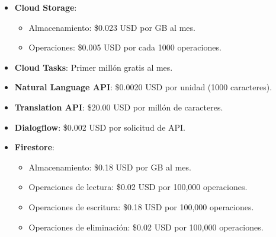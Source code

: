 \begin{enumerate}
\begin{enumerate}
\begin{itemize}
					\item \textbf{Cloud Storage}:
						\begin{itemize}
							\item Almacenamiento: \$0.023 USD por GB al mes.

							\item Operaciones: \$0.005 USD por cada 1000 operaciones.
						\end{itemize}

					\item \textbf{Cloud Tasks}: Primer millón gratis al mes.

					\item \textbf{Natural Language API}: \$0.0020 USD por unidad (1000 caracteres).

					\item \textbf{Translation API}: \$20.00 USD por millón de caracteres.

					\item \textbf{Dialogflow}: \$0.002 USD por solicitud de API.

					\item \textbf{Firestore}:
						\begin{itemize}
							\item Almacenamiento: \$0.18 USD por GB al mes.

							\item Operaciones de lectura: \$0.02 USD por 100,000 operaciones.

							\item Operaciones de escritura: \$0.18 USD por 100,000 operaciones.

							\item Operaciones de eliminación: \$0.02 USD por 100,000 operaciones.
						\end{itemize}
				\end{itemize}


\end{enumerate}
\end{enumerate}
